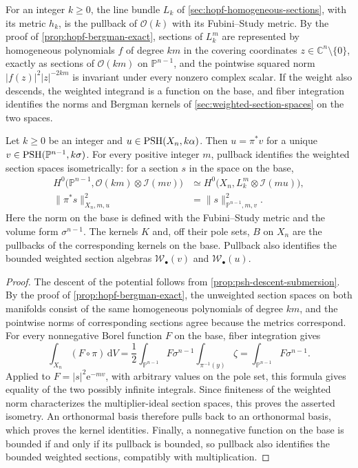 For an integer $k\geq0$, the line bundle $L_k$ of \cref{sec:hopf-homogeneous-sections}, with its metric $h_k$, is the pullback of $\mathcal O(k)$ with its Fubini--Study metric. By the proof of \cref{prop:hopf-bergman-exact}, sections of $L_k^m$ are represented by homogeneous polynomials $f$ of degree $km$ in the covering coordinates $z\in\mathbb C^n\setminus\{0\}$, exactly as sections of $\mathcal O(km)$ on $\mathbb P^{n-1}$, and the pointwise squared norm $|f(z)|^2|z|^{-2km}$ is invariant under every nonzero complex scalar. If the weight also descends, the weighted integrand is a function on the base, and fiber integration identifies the norms and Bergman kernels of \cref{sec:weighted-section-spaces} on the two spaces.

\begin{theorem}\label{thm:hopf-weighted-section-descent}
Let $k\geq0$ be an integer and $u\in\mathrm{PSH}(X_n,k\alpha)$. Then $u=\pi^*v$ for a unique $v\in\mathrm{PSH}(\mathbb P^{n-1},k\sigma)$. For every positive integer $m$, pullback identifies the weighted section spaces isometrically: for a section $s$ in the space on the base,
\[
 \begin{split}
 H^0\bigl(\mathbb P^{n-1},\mathcal O(km)\otimes\mathcal I(mv)\bigr)
 &\simeq H^0\bigl(X_n,L_k^m\otimes\mathcal I(mu)\bigr),\\
 \|\pi^*s\|_{X_n,m,u}^2&=\|s\|_{\mathbb P^{n-1},m,v}^2.
 \end{split}
\]
Here the norm on the base is defined with the Fubini--Study metric and the volume form $\sigma^{n-1}$. The kernels $K$ and, off their pole sets, $B$ on $X_n$ are the pullbacks of the corresponding kernels on the base. Pullback also identifies the bounded weighted section algebras $\mathcal W_\bullet(v)$ and $\mathcal W_\bullet(u)$.
\end{theorem}
\begin{proof}
The descent of the potential follows from \cref{prop:psh-descent-submersion}. By the proof of \cref{prop:hopf-bergman-exact}, the unweighted section spaces on both manifolds consist of the same homogeneous polynomials of degree $km$, and the pointwise norms of corresponding sections agree because the metrics correspond. For every nonnegative Borel function $F$ on the base, fiber integration gives
\[
 \int_{X_n}(F\circ\pi)\,\mathrm{d}V
 =\frac12\int_{\mathbb P^{n-1}}F\sigma^{n-1}
                         \int_{\pi^{-1}(y)}\zeta
 =\int_{\mathbb P^{n-1}}F\sigma^{n-1}.
\]
Applied to $F=|s|^2\mathrm{e}^{-mv}$, with arbitrary values on the pole set, this formula gives equality of the two possibly infinite integrals. Since finiteness of the weighted norm characterizes the multiplier-ideal section spaces, this proves the asserted isometry. An orthonormal basis therefore pulls back to an orthonormal basis, which proves the kernel identities. Finally, a nonnegative function on the base is bounded if and only if its pullback is bounded, so pullback also identifies the bounded weighted sections, compatibly with multiplication.
\end{proof}

